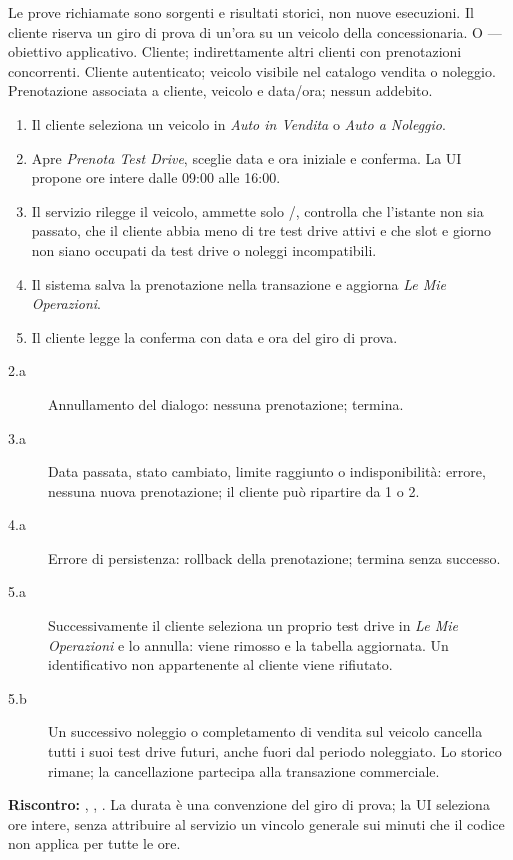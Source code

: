 Le prove richiamate sono sorgenti e risultati storici, non nuove esecuzioni.
\clearpage
{}
{Il cliente riserva un giro di prova di un'ora su un veicolo della concessionaria.}
{O --- obiettivo applicativo.}
{Cliente; indirettamente altri clienti con prenotazioni concorrenti.}
{Cliente autenticato; veicolo visibile nel catalogo vendita o noleggio.}
{Prenotazione associata a cliente, veicolo e data/ora; nessun addebito.}
\principale
\begin{enumerate}
\item Il cliente seleziona un veicolo in \emph{Auto in Vendita} o \emph{Auto a Noleggio}.
\item Apre \emph{Prenota Test Drive}, sceglie data e ora iniziale e conferma.
      La UI propone ore intere dalle 09:00 alle 16:00.
\item Il servizio rilegge il veicolo, ammette solo /,
      controlla che l'istante non sia passato, che il cliente abbia meno di tre
      test drive attivi e che slot e giorno non siano occupati da test drive o noleggi incompatibili.
\item Il sistema salva la prenotazione nella transazione e aggiorna \emph{Le Mie Operazioni}.
\item Il cliente legge la conferma con data e ora del giro di prova.
\end{enumerate}
\alternative
\begin{description}
\item[2.a] Annullamento del dialogo: nessuna prenotazione; termina.
\item[3.a] Data passata, stato cambiato, limite raggiunto o indisponibilit\`a:
  errore, nessuna nuova prenotazione; il cliente pu\`o ripartire da 1 o 2.
\item[4.a] Errore di persistenza: rollback della prenotazione; termina senza successo.
\item[5.a] Successivamente il cliente seleziona un proprio test drive in
  \emph{Le Mie Operazioni} e lo annulla: viene rimosso e la tabella aggiornata.
  Un identificativo non appartenente al cliente viene rifiutato.
\item[5.b] Un successivo noleggio o completamento di vendita sul veicolo
  cancella tutti i suoi test drive futuri, anche fuori dal periodo noleggiato.
  Lo storico rimane; la cancellazione partecipa alla transazione commerciale.
\end{description}
\begin{flushleft}\textbf{Riscontro:} , ,
. La durata \`e una convenzione del giro di prova;
la UI seleziona ore intere, senza attribuire al servizio un vincolo generale
sui minuti che il codice non applica per tutte le ore.\end{flushleft}


